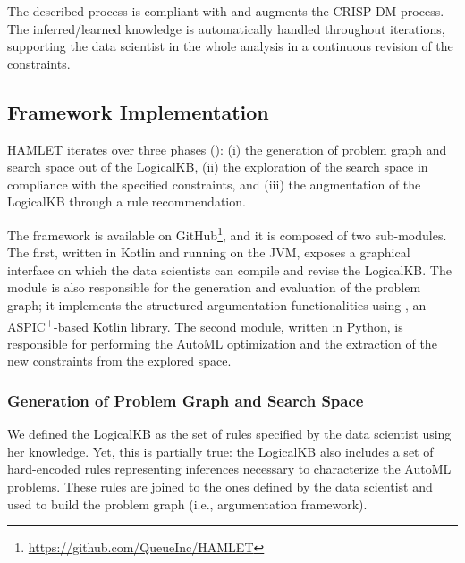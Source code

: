 The described process is compliant with and augments the CRISP-DM process.
The inferred/learned knowledge is automatically handled throughout iterations, supporting the data scientist in the whole analysis in a continuous revision of the constraints.
\vspace{2cm}

\subsection{Framework Implementation}\label{hamlet-ssec:implementation}

HAMLET iterates over three phases (): (i) the generation of problem graph and search space out of the LogicalKB, (ii) the exploration of the search space in compliance with the specified constraints, and (iii) the augmentation of the LogicalKB through a rule recommendation.

The framework is available on GitHub\footnote{\url{https://github.com/QueueInc/HAMLET}}, and it is composed of two sub-modules.
The first, written in Kotlin and running on the JVM, exposes a graphical interface on which the data scientists can compile and revise the LogicalKB.
The module is also responsible for the generation and evaluation of the problem graph; it implements the structured argumentation functionalities using \argtup{} \cite{arg2p-jlc}, an ASPIC\textsuperscript{+}-based Kotlin library.
The second module, written in Python, is responsible for performing the AutoML optimization and the extraction of the new constraints from the explored space.

\subsubsection{Generation of Problem Graph and Search Space}
We defined the LogicalKB as the set of rules specified by the data scientist using her knowledge.
Yet, this is partially true: the LogicalKB also includes a set of hard-encoded rules representing inferences necessary to characterize the AutoML problems.
These rules are joined to the ones defined by the data scientist and used to build the problem graph (i.e., argumentation framework).

